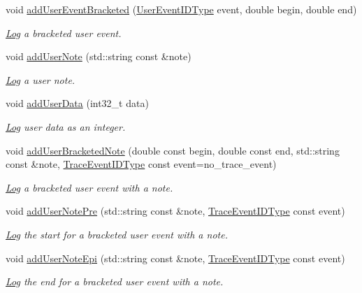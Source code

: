 \begin{DoxyCompactItemize}
void \hyperlink{namespacevt_1_1trace_ab090a5c9eae800c6820c88b3fe56c9c8}{add\+User\+Event\+Bracketed} (\hyperlink{namespacevt_1_1trace_a5908920d051c144c89f17c69ed262350}{User\+Event\+I\+D\+Type} event, double begin, double end)
\begin{DoxyCompactList}\small\item\em \hyperlink{structvt_1_1trace_1_1_log}{Log} a bracketed user event. \end{DoxyCompactList}\item 
void \hyperlink{namespacevt_1_1trace_ad679bbbe9a03da579b442dfdba9cef7b}{add\+User\+Note} (std\+::string const  \&note)
\begin{DoxyCompactList}\small\item\em \hyperlink{structvt_1_1trace_1_1_log}{Log} a user note. \end{DoxyCompactList}\item 
void \hyperlink{namespacevt_1_1trace_a0ec1ac44fb179f29245a36b887f588f1}{add\+User\+Data} (int32\+\_\+t data)
\begin{DoxyCompactList}\small\item\em \hyperlink{structvt_1_1trace_1_1_log}{Log} user data as an integer. \end{DoxyCompactList}\item 
void \hyperlink{namespacevt_1_1trace_a4617340b633aaa7261727dab91532a2a}{add\+User\+Bracketed\+Note} (double const begin, double const end, std\+::string const  \&note, \hyperlink{namespacevt_1_1trace_a64a7185f3e102df8d8258f263ccd1582}{Trace\+Event\+I\+D\+Type} const event=no\+\_\+trace\+\_\+event)
\begin{DoxyCompactList}\small\item\em \hyperlink{structvt_1_1trace_1_1_log}{Log} a bracketed user event with a note. \end{DoxyCompactList}\item 
void \hyperlink{namespacevt_1_1trace_a4b3d43783121ba2ef4459b9d0ce36e6c}{add\+User\+Note\+Pre} (std\+::string const  \&note, \hyperlink{namespacevt_1_1trace_a64a7185f3e102df8d8258f263ccd1582}{Trace\+Event\+I\+D\+Type} const event)
\begin{DoxyCompactList}\small\item\em \hyperlink{structvt_1_1trace_1_1_log}{Log} the start for a bracketed user event with a note. \end{DoxyCompactList}\item 
void \hyperlink{namespacevt_1_1trace_aa827aafa1d2a9ae4e22fd7494ef2750b}{add\+User\+Note\+Epi} (std\+::string const  \&note, \hyperlink{namespacevt_1_1trace_a64a7185f3e102df8d8258f263ccd1582}{Trace\+Event\+I\+D\+Type} const event)
\begin{DoxyCompactList}\small\item\em \hyperlink{structvt_1_1trace_1_1_log}{Log} the end for a bracketed user event with a note. \end{DoxyCompactList}\end{DoxyCompactItemize}


